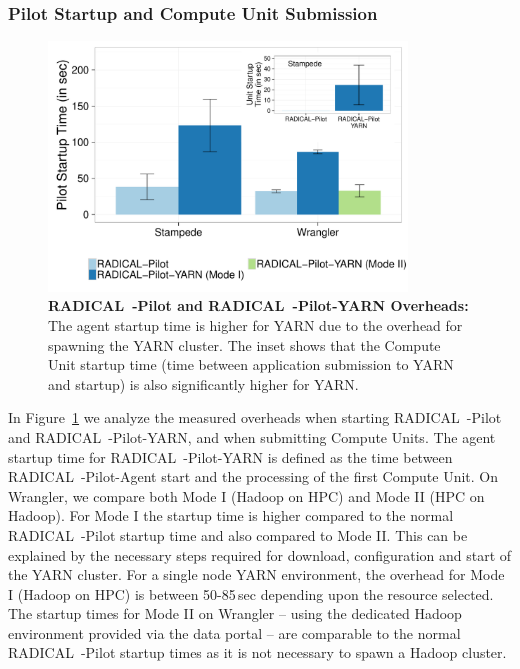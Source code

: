 \subsubsection{Pilot Startup and Compute Unit Submission}
\label{sec:startup_pilot_unit}

\begin{figure}
    \centering
    \includegraphics[width=0.85\textwidth]{figures/data_analytics_hpc/hpc_hadoop/pilot_unit_startup.pdf}
    \caption{\textbf{RADICAL~-Pilot and RADICAL~-Pilot-YARN Overheads:}
        The agent startup time is higher for YARN due to the overhead for spawning the YARN cluster.
        The inset shows that the Compute Unit startup time (time between application submission to YARN and startup) is also significantly higher for YARN.
        \label{fig:startup_yarn}}
\end{figure}

In Figure~\ref{fig:startup_yarn} we analyze the measured overheads when starting RADICAL~-Pilot and RADICAL~-Pilot-YARN, and when submitting Compute Units.
The agent startup time for RADICAL~-Pilot-YARN is defined as the time between RADICAL~-Pilot-Agent start and the processing of the first Compute Unit.
On Wrangler, we compare both Mode I (Hadoop on HPC) and Mode II (HPC on Hadoop).
For Mode I the startup time is higher compared to the normal RADICAL~-Pilot startup time and also compared to Mode II.
This can be explained by the necessary steps required for download, configuration and start of the YARN cluster.
For a single node YARN environment, the overhead for Mode I (Hadoop on HPC) is between 50-85\,sec depending upon the resource selected.
The startup times for Mode II on Wrangler -- using the dedicated Hadoop environment provided via the data portal -- are comparable to the normal RADICAL~-Pilot startup times as it is not necessary to spawn a Hadoop cluster.

